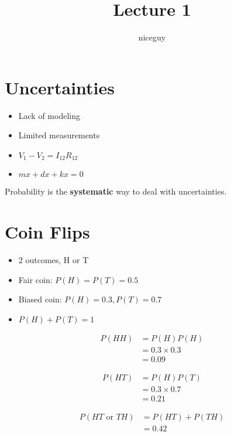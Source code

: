 \documentclass[12pt]{article}
\author{niceguy}
\title{Lecture 1}
\begin{document}
\maketitle

\section{Uncertainties}

\begin{itemize}
	\item Lack of modeling
	\item Limited measurements
	\item $V_1 - V_2 = I_{12}R_{12}$
	\item $mx + dx + kx = 0$
\end{itemize}

Probability is the \textbf{systematic} way to deal with uncertainties.

\section{Coin Flips}

\begin{itemize}
	\item 2 outcomes, H or T
	\item Fair coin: $P(H) = P(T) = 0.5$
	\item Biased coin: $P(H) = 0.3, P(T) = 0.7$
	\item $P(H) + P(T) = 1$
\end{itemize}

\begin{ex}
	\begin{align*}
		P(HH) &= P(H)P(H) \\
		      &= 0.3 \times 0.3 \\
		      &= 0.09
	\end{align*}
\end{ex}

\begin{ex}
	\begin{align*}
		P(HT) &= P(H)P(T) \\
		      &= 0.3 \times 0.7 \\
		      &= 0.21
	\end{align*}
\end{ex}

\begin{ex}
	\begin{align*}
		P(HT \text{ or } TH) &= P(HT) + P(TH) \\
				     &= 0.42
	\end{align*}
\end{ex}
\end{document}
